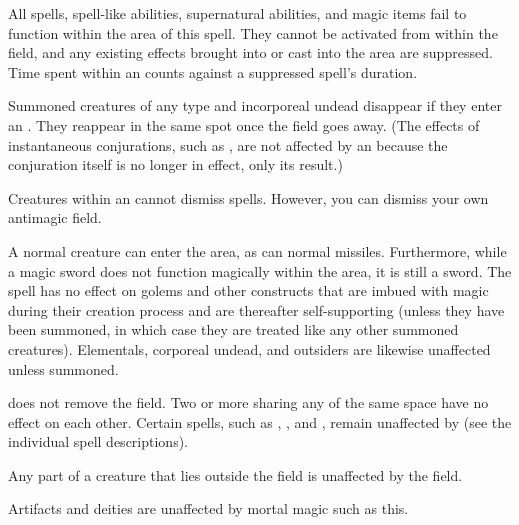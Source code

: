 \begin{spelleffect}
  All spells, spell-like abilities, supernatural abilities, and magic items fail to function within the area of this spell. They cannot be activated from within the field, and any existing effects brought into or cast into the area are suppressed. Time spent within an  counts against a suppressed spell's duration.
  \par Summoned creatures of any type and incorporeal undead disappear if they enter an . They reappear in the same spot once the field goes away. (The effects of instantaneous conjurations, such as , are not affected by an  because the conjuration itself is no longer in effect, only its result.)
  \par Creatures within an  cannot dismiss spells. However, you can dismiss your own antimagic field.
\end{spelleffect}
\begin{spellnotes}
  A normal creature can enter the area, as can normal missiles. Furthermore, while a magic sword does not function magically within the area, it is still a sword. The spell has no effect on golems and other constructs that are imbued with magic during their creation process and are thereafter self-supporting (unless they have been summoned, in which case they are treated like any other summoned creatures). Elementals, corporeal undead, and outsiders are likewise unaffected unless summoned.
  \par {} does not remove the field. Two or more  sharing any of the same space have no effect on each other. Certain spells, such as , , and , remain unaffected by  (see the individual spell descriptions).
  \par Any part of a creature that lies outside the field is unaffected by the field.
  \par Artifacts and deities are unaffected by mortal magic such as this. 
\end{spellnotes}

